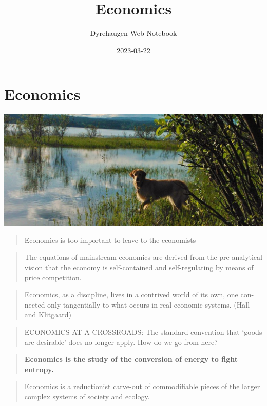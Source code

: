 \documentclass[
]{book}
\title{Economics}
\author{Dyrehaugen Web Notebook}
\date{2023-03-22}
\begin{document}
\maketitle

{
\setcounter{tocdepth}{1}
\tableofcontents
}
\hypertarget{economics}{%
\chapter{Economics}\label{economics}}

\includegraphics{fig/zelda.jpg}

\begin{quote}
Economics is too important to leave to the economists
\end{quote}

\begin{quote}
The equations of mainstream economics
are derived from the pre-analytical vision that
the economy is self-contained and self-regulating
by means of price competition.
\end{quote}

\begin{quote}
Economics, as a discipline, lives
in a contrived world of its own, one con-
nected only tangentially to what occurs in
real economic systems. (Hall and Klitgaard)
\end{quote}

\begin{quote}
ECONOMICS AT A CROSSROADS: The standard convention
that `goods are desirable' does no longer apply.
How do we go from here?
\end{quote}

\begin{quote}
\textbf{Economics is the study of the conversion of energy to fight entropy.}
\end{quote}

\begin{quote}
Economics is a reductionist carve-out of commodifiable pieces of
the larger complex systems of society and ecology.
\end{quote}
\end{document}
